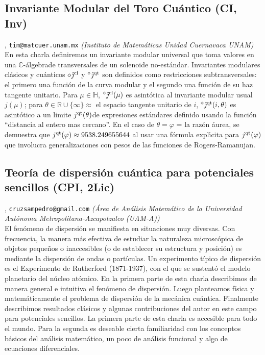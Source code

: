 \subsection{\sffamily Invariante Modular del Toro Cu\'antico {\footnotesize (CI, Inv)}} \label{reg-1530} 
, {\tt tim@matcuer.unam.mx}  {\slshape (Instituto de Matem\'aticas Unidad Cuernavaca UNAM)}\\
          \noindent En esta charla definiremos un invariante modular universal que toma valores en una $\mathbb{C}$-\'{a}lgebrade transversales de un solenoide no-est\'andar.  Invariantes modulares cl\'{a}sicos y cu\'{a}nticos  $\diamond \hat{\jmath}^{\rm cl}$ y ${}^{\diamond} \hat{\jmath}^{\rm qt}$ son definidos como restricciones subtransversales: el primero una funci\'{o}n de la curva modular y el segundo una funci\'{o}n de su haz tangente unitario.  Para $\mu\in\mathbb{H}$, ${}^{\diamond}\hat{\jmath}^{\rm cl}(\mu)$ es asint\'{o}tica al invariante modular usual $j(\mu )$; para $\theta\in\mathbb{R}\cup\{\infty\}\approx$ el espacio tangente unitario de $i$, ${}^{\diamond}\hat{\jmath}^{\rm qt}(i,\theta )$ es asint\'{o}tico a un limite $j^{\rm qt}(\theta )$de expresiones est\'andares definido usando la funci\'{o}n ``distancia al entero mas cercano''. En el caso de $\theta=\varphi$ = la raz\'on \'{a}urea, se demuestra que $j^{\rm qt}(\varphi )\approx 9538.249655644 $ al usar una f\'{o}rmula expl\'{\i}cita para $j^{\rm qt}(\varphi )$ que involucra generalizaciones con pesos de las funciones de Rogers-Ramanujan.
\subsection{\sffamily Teor\'ia de dispersi\'on cu\'antica  para potenciales sencillos {\footnotesize (CPI, 2Lic)}} \label{reg-729} 
, {\tt cruzsampedro@gmail.com}  {\slshape (\'Area de An\'alisis Matem\'atico de la Universidad Aut\'onoma Metropolita\-na-Azca\-pot\-zal\-co (UAM-A))}\\
          \noindent El  fen\'omeno de  dispersi\'on se manifiesta en situaciones muy diversas. Con frecuencia, la manera m\'as efectiva  de estudiar la naturaleza microsc\'opica de objetos peque\~nos o inaccesibles (o de establecer su estructura y posici\'on) es mediante  la dispersi\'on de ondas o part\'iculas. Un experimento t\'ipico de dispersi\'on es el Experimento de Rutherford (1871-1937),   con el que se  sustent\'o el modelo planetario del n\'ucleo at\'omico. En la primera parte de esta charla describimos de manera  general e intuitiva el fen\'omeno de dispersi\'on. Luego   planteamos f\'isica y matem\'aticamente  el problema de dispersi\'on de la mec\'anica cu\'antica.  Finalmente describimos  resultados cl\'asicos y algunas contribuciones del autor en este campo para potenciales sencillos. La primera parte de esta charla es accesible para todo el mundo. Para la segunda es deseable cierta familiaridad con  los conceptos b\'asicos del an\'alisis matem\'atico, un poco de an\'alisis funcional y algo de ecuaciones diferenciales.
